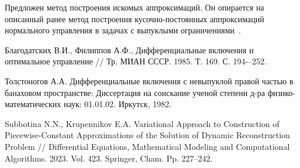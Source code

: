 Предложен метод построения искомых аппроксимаций. Он опирается на описанный ранее метод построения кусочно-постоянных аппроксимаций нормального управления в задачах с выпуклыми ограничениями~\cite{Krupennikov:subb4}.





%



\begin{thebibliography}{9} %

Благодатских В.И., Филиппов А.Ф., Дифференциальные включения и оптимальное управление // Тр. МИАН СССР. 1985. Т. 169. С. 194-–252.

 Толстоногов А.А. Дифференциальные включения с невыпуклой правой частью в банаховом пространстве: Диссертация на соискание ученой степени д-ра физико-математических наук: 01.01.02. Иркутск, 1982.

	Subbotina N.N., Krupennikov E.A. Variational Approach to Construction of Piecewise-Constant Approximations of the Solution of Dynamic Reconstruction Problem  // Differential Equations, Mathematical Modeling and Computational Algorithms. 2023. Vol. 423. Springer, Cham. Pp. 227--242.
\end{thebibliography}





%

